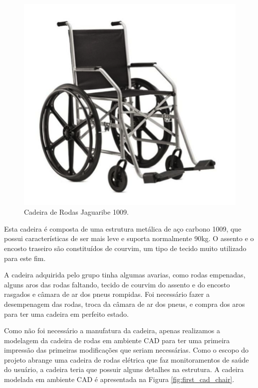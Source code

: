 \begin{figure}[!htb]
    \begin{center}
        \includegraphics{figuras/original_chair.png}
    \end{center}
    \caption{Cadeira de Rodas Jaguaribe 1009.}
    \label{fig:original_chair}
\end{figure}

Esta cadeira é composta de uma estrutura metálica de aço carbono 1009, que
possui características de ser mais leve e suporta normalmente 90kg. O assento
e o encosto traseiro são constituídos de courvim, um tipo de tecido muito
utilizado para este fim.

A cadeira adquirida pelo grupo tinha algumas avarias, como rodas empenadas,
alguns aros das rodas faltando, tecido de courvim do assento e do encosto
rasgados e câmara de ar dos pneus rompidas. Foi necessário fazer a desempenagem
das rodas, troca da câmara de ar dos pneus, e compra dos aros para ter uma
cadeira em perfeito estado.

Como não foi necessário a manufatura da cadeira, apenas realizamos a modelagem
da cadeira de rodas em ambiente CAD para ter uma primeira impressão das
primeiras modificações que seriam necessárias. Como o escopo do projeto abrange
uma cadeira de rodas elétrica que faz monitoramentos de saúde do usuário, a
cadeira teria que possuir alguns detalhes na estrutura. A cadeira modelada em
ambiente CAD é apresentada na Figura \ref{fig:first_cad_chair}.


